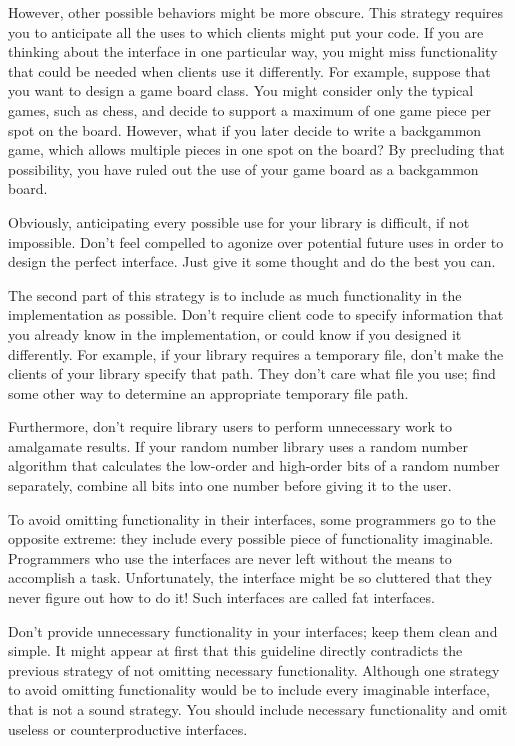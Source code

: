 However, other possible behaviors might be more obscure. This strategy requires you to anticipate all the uses to which clients might put your code. If you are thinking about the interface in one particular way, you might miss functionality that could be needed when clients use it differently. For example, suppose that you want to design a game board class. You might consider only the typical games, such as chess, and decide to support a maximum of one game piece per spot on the board. However, what if you later decide to write a backgammon game, which allows multiple pieces in one spot on the board? By precluding that possibility, you have ruled out the use of your game board as a backgammon board.

Obviously, anticipating every possible use for your library is difficult, if not impossible. Don’t feel compelled to agonize over potential future uses in order to design the perfect interface. Just give it some thought and do the best you can.

The second part of this strategy is to include as much functionality in the implementation as possible. Don’t require client code to specify information that you already know in the implementation, or could know if you designed it differently. For example, if your library requires a temporary file, don’t make the clients of your library specify that path. They don’t care what file you use; find some other way to determine an appropriate temporary file path.

Furthermore, don’t require library users to perform unnecessary work to amalgamate results. If your random number library uses a random number algorithm that calculates the low-order and high-order bits of a random number separately, combine all bits into one number before giving it to the user.


To avoid omitting functionality in their interfaces, some programmers go to the opposite extreme: they include every possible piece of functionality imaginable. Programmers who use the interfaces are never left without the means to accomplish a task. Unfortunately, the interface might be so cluttered that they never figure out how to do it! Such interfaces are called fat interfaces.

Don’t provide unnecessary functionality in your interfaces; keep them clean and simple. It might appear at first that this guideline directly contradicts the previous strategy of not omitting necessary functionality. Although one strategy to avoid omitting functionality would be to include every imaginable interface, that is not a sound strategy. You should include necessary functionality and omit useless or counterproductive interfaces.

